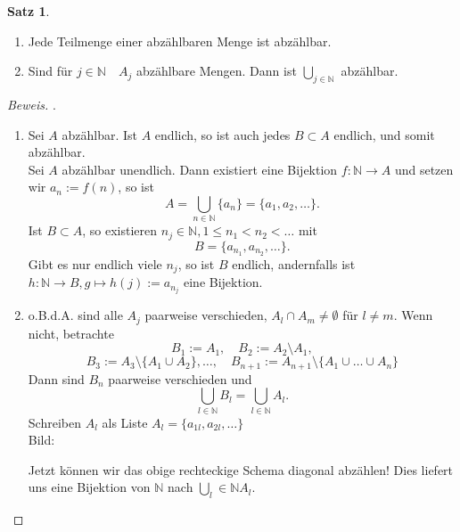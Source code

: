 \documentclass[12pt,a4paper,titlepage]{article} %
\theoremstyle{definition}
\newtheorem{satz}{Satz}[subsection]
\theoremstyle{remark}
\newenvironment{bew}{\begin{proof}[Beweis]}{\end{proof}}
\newcommand{\N}{\mathbb{N}}
\begin{document}
\begin{satz}
	\begin{enumerate} . %
		\item Jede Teilmenge einer abzählbaren Menge ist abzählbar.
		\item Sind für $j\in\N \quad A_j$ abzählbare Mengen. Dann ist $\bigcup_{j\in\N}$ abzählbar.
	\end{enumerate}
\end{satz}
\begin{bew} . %
	\begin{enumerate}
		\item Sei $A$ abzählbar. Ist $A$ endlich, so ist auch jedes $B\subset A$ endlich, und somit abzählbar.\\
		Sei $A$ abzählbar unendlich. Dann existiert eine Bijektion $f: \N \rightarrow A$ und setzen wir $a_n := f(n)$, so ist
		$$A = \bigcup_{n\in\N} \{a_n\} = \{a_1, a_2,\ldots\}.$$
		Ist $B\subset A$, so existieren $n_j \in\N, 1\leq n_1<n_2<\ldots$ mit $$B = \{a_{n_1}, a_{n_2}, \ldots\}.$$
		Gibt es nur endlich viele $n_j$, so ist $B$ endlich, andernfalls ist $h: \N \rightarrow B, g \mapsto h(j) := a_{n_j}$
		eine Bijektion.
		\item o.B.d.A. sind alle $A_j$ paarweise verschieden, $A_l \cap A_m \neq \emptyset$ für \(l\neq m\).
		Wenn nicht, betrachte 
		\[B_1 := A_1, \quad B_2 := A_2 \setminus A_1,\]
		\[B_3 := A_3 \setminus \{A_1 \cup A_2\}, \ldots, \quad B_{n+1} := A_{n+1} \setminus \{A_1\cup\ldots\cup A_n\}\]
		Dann sind \(B_n\) paarweise verschieden und \[\bigcup_{l\in\N} B_l = \bigcup_{l\in\N} A_l.\]
		Schreiben \(A_l\) als Liste \(A_l = \{a_{1l}, a_{2l}, \ldots\}\)\\
		Bild: 
		Jetzt können wir das obige rechteckige Schema diagonal abzählen! Dies liefert uns eine Bijektion von \(\N\) nach \(\bigcup_l\in\N A_l\).
	\end{enumerate}
\end{bew}
\end{document}
